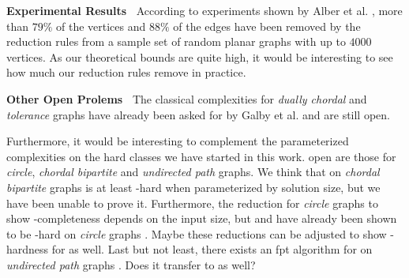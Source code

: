 \noindent \textbf{Experimental Results~}
According to experiments shown by Alber et al. \cite{Alber2004}, more than $79\%$ of the vertices and $88\%$ of the edges have been removed by the reduction rules from a sample set of random planar graphs with up to $4000$ vertices. 
As our theoretical bounds are quite high, it would be interesting to see how much our reduction rules remove in practice. 

\noindent \textbf{Other Open Prolems~}
The classical complexities for \textit{dually chordal} and \textit{tolerance} graphs have already been asked for by Galby et al. \cite{Galby2020} and are still open.

Furthermore, it would be interesting to complement the parameterized complexities on the hard classes we have started in this work.
open are those for \textit{circle}, \textit{chordal bipartite} and \textit{undirected path} graphs.
We think that \sdoms on \textit{chordal bipartite} graphs is at least \WONEhs-hard when parameterized by solution size, but we have been unable to prove it.
Furthermore, the reduction for \textit{circle} graphs \cite{Kloks2021} to show \NP-completeness depends on the input size, but \doms and \tdoms have already been shown to be \WONEhs-hard on \textit{circle} graphs \cite{Bousquet2012}. 
Maybe these reductions can be adjusted to show \WONEhs-hardness for \sdoms as well.
Last but not least, there exists an fpt algorithm for \doms on \textit{undirected path} graphs \cite{Figueiredo2022}. 
Does it transfer to \sdoms as well?

